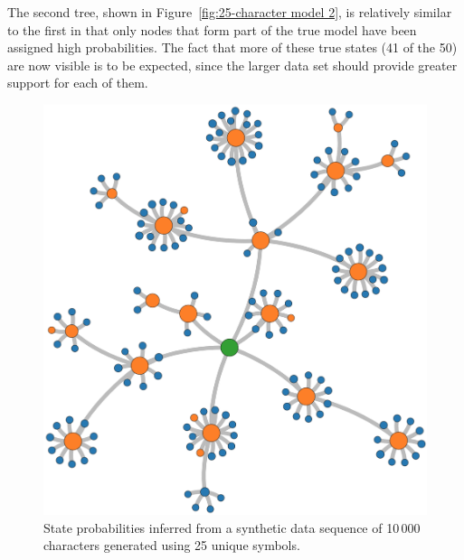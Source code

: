 \documentclass[12pt,a4paper]{article}
\begin{document}
The second tree, shown in Figure~\ref{fig:25-character model 2}, is relatively
similar to the first in that only nodes that form part of the true model have
been assigned high probabilities. The fact that more of these true states (41 of
the 50) are now visible is to be expected, since the larger data set should
provide greater support for each of them.
%
\begin{figure}[htbp]
  \includegraphics[width=\textwidth]{figures/synthetic 1}
\caption{State probabilities inferred from a synthetic data sequence of 10\,000
  characters generated using 25 unique symbols.}
\label{fig:25-character model 1}
\end{figure}
%
\end{document}
